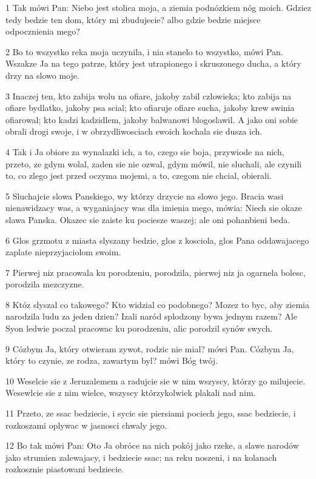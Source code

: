\par 1 Tak mówi Pan: Niebo jest stolica moja, a ziemia podnózkiem nóg moich. Gdziez tedy bedzie ten dom, który mi zbudujecie? albo gdzie bedzie miejsce odpocznienia mego?
\par 2 Bo to wszystko reka moja uczynila, i nia stanelo to wszystko, mówi Pan. Wszakze Ja na tego patrze, który jest utrapionego i skruszonego ducha, a który drzy na slowo moje.
\par 3 Inaczej ten, kto zabija wolu na ofiare, jakoby zabil czlowieka; kto zabija na ofiare bydlatko, jakoby psa scial; kto ofiaruje ofiare sucha, jakoby krew swinia ofiarowal; kto kadzi kadzidlem, jakoby balwanowi blogoslawil. A jako oni sobie obrali drogi swoje, i w obrzydliwosciach swoich kochala sie dusza ich.
\par 4 Tak i Ja obiore za wynalazki ich, a to, czego sie boja, przywiode na nich, przeto, ze gdym wolal, zaden sie nie ozwal, gdym mówil, nie sluchali, ale czynili to, co zlego jest przed oczyma mojemi, a to, czegom nie chcial, obierali.
\par 5 Sluchajcie slowa Panskiego, wy którzy drzycie na slowo jego. Bracia wasi nienawidzacy was, a wyganiajacy was dla imienia mego, mówia: Niech sie okaze slawa Panska. Okazec sie zaiste ku pociesze waszej; ale oni pohanbieni beda.
\par 6 Glos grzmotu z miasta slyszany bedzie, glos z kosciola, glos Pana oddawajacego zaplate nieprzyjaciolom swoim.
\par 7 Pierwej niz pracowala ku porodzeniu, porodzila, pierwej niz ja ogarnela bolesc, porodzila mezczyzne.
\par 8 Któz slyszal co takowego? Kto widzial co podobnego? Mozez to byc, aby ziemia narodzila ludu za jeden dzien? Izali naród splodzony bywa jednym razem? Ale Syon ledwie poczal pracowac ku porodzeniu, alic porodzil synów swych.
\par 9 Cózbym Ja, który otwieram zywot, rodzic nie mial? mówi Pan. Cózbym Ja, który to czynie, ze rodza, zawartym byl? mówi Bóg twój.
\par 10 Weselcie sie z Jeruzalemem a radujcie sie w nim wszyscy, którzy go milujecie. Wesewlcie sie z nim wielce, wszyscy którzykolwiek plakali nad nim.
\par 11 Przeto, ze ssac bedziecie, i sycic sie piersiami pociech jego, ssac bedziecie, i rozkoszami oplywac w jasnosci chwaly jego.
\par 12 Bo tak mówi Pan: Oto Ja obróce na nich pokój jako rzeke, a slawe narodów jako strumien zalewajacy, i bedziecie ssac; na reku noszeni, i na kolanach rozkosznie piastowani bedziecie.
